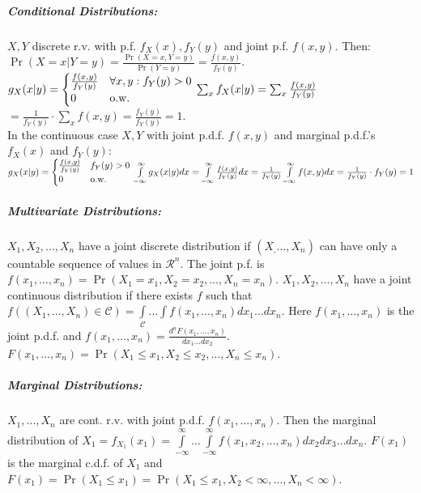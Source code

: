 \documentclass[landscape,10pt]{article}
\begin{document}
\begin{multicols}{4}
    \subparagraph*{Conditional Distributions: }
        \(X, Y\) discrete r.v. with p.f. \(f_X(x), f_Y(y)\) and joint p.f. \(f(x,y)\). Then: \\
        \(\Pr(X = x | Y = y) = \frac{\Pr(X = x, Y = y)}{\Pr(Y = y)} = \frac{f(x,y)}{f_Y(y)}\). \\
        \(g_X(x|y) = \begin{cases} \frac{f(x,y)}{f_Y(y)} & \forall x,y: f_Y(y) > 0 \\ 0 & \text{o.w.}\end{cases} \\
        \sum_x{f_X(x|y)} = \sum_x{\frac{f(x,y)}{f_Y(y)}} \)
             \(= \frac{1}{f_Y(y)} \cdot \sum_x{f(x,y)} = \frac{f_Y(y)}{f_Y(y)} = 1\). \\
    In the continuous case \(X, Y\) with joint p.d.f. \(f(x,y)\) and marginal p.d.f.'s \(f_X(x)\) and \(f_Y(y)\): \\
    \(g_X(x|y) = \begin{cases} \frac{f(x,y)}{f_Y(y)} & f_Y(y) > 0 \\ 0 & \text{o.w.} \end{cases} \\
    \int\limits_{-\infty}^{\infty}g_X(x|y)dx = \int\limits_{-\infty}^{\infty} \frac{f(x,y)}{f_Y(y)}dx = \frac{1}{f_Y(y)} \int\limits_{-\infty}^{\infty}f(x,y)dx = \frac{1}{f_Y(y)} \cdot f_Y(y) = 1\)

\subparagraph*{Multivariate Distributions:}
 \(X_1, X_2, \ldots, X_n\) have a joint discrete distribution if \((X_, \dots, X_n)\) can have only a countable sequence of values in \(\mathcal{R}^n\). The joint p.f. is \(f(x_1,\dots,x_n) = \Pr(X_1=x_1, X_2=x_2,\ldots,X_n=x_n)\). \(X_1, X_2, \ldots, X_n\) have a joint continuous distribution if there exists \(f\) such that \(f\left((X_1,\ldots,X_n)\in \mathcal{C}\right) = \int\limits_{\mathcal{C}}\dots\int f(x_1,\ldots,x_n)dx_1\ldots dx_n\). Here \(f(x_1,\ldots,x_n)\) is the joint p.d.f. and \(f(x_1,\ldots,x_n) = \frac{d^nF(x_1,\ldots,x_n)}{dx_1\ldots dx_2}\). \(F(x_1,\ldots,x_n) = \Pr(X_1 \leq x_1, X_2 \leq x_2, \ldots, X_n \leq x_n)\).

 \subparagraph*{Marginal Distributions: }
    \(X_1, \ldots, X_n\) are cont. r.v. with joint p.d.f. \(f(x_1, \ldots, x_n)\). Then the marginal distribution of \(X_1 = f_{X_1}(x_1) = \int\limits_{- \infty}^{\infty} \dots \int\limits_{- \infty}^{\infty} f(x_1,x_2, \ldots, x_n)dx_2dx_3\ldots dx_n\). \(F(x_1)\) is the marginal c.d.f. of \(X_1\) and \(F(x_1) = \Pr(X_1 \leq x_1) = \Pr(X_1 \leq x_1, X_2 < \infty, \ldots, X_n < \infty)\).


\end{multicols}
\end{document}
